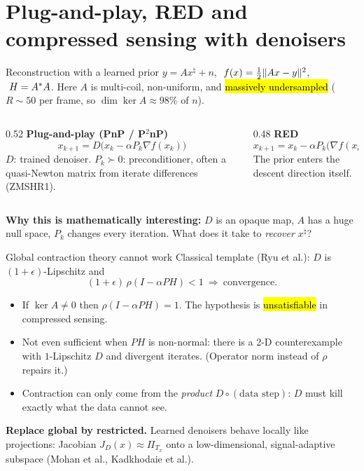 \section{Plug-and-play, RED and compressed sensing with denoisers}

\begin{frame}{Reconstruction with a learned prior}
$y=Ax^\natural+n$, $\ f(x)=\tfrac12\lVert Ax-y\rVert^2$, $\ H=A^{*} A$. Here $A$ is multi-coil, non-uniform, and \hl{massively undersampled} ($R\sim50$ per frame, so $\dim\ker A\approx 98\%$ of $n$).
\pause
\medskip
\begin{columns}[T]
\begin{column}{0.52\textwidth}
\textbf{Plug-and-play (PnP / P$^2$nP)}
\[ x_{k+1}=D\big(x_k-\alpha P_k\nabla f(x_k)\big) \]
$D$: trained denoiser. $P_k\succ0$: preconditioner, often a quasi-Newton matrix from iterate differences (ZMSHR1).
\end{column}
\begin{column}{0.48\textwidth}
\textbf{RED}
\[ x_{k+1}=x_k-\alpha P_k\big(\nabla f(x_k)+\lambda(x_k-D(x_k))\big) \]
The prior enters the descent direction itself.
\end{column}
\end{columns}
\pause
\medskip
\textbf{Why this is mathematically interesting:} $D$ is an opaque map, $A$ has a huge null space, $P_k$ changes every iteration. What does it take to \emph{recover $x^\natural$}?
\end{frame}

\begin{frame}{Global contraction theory cannot work}
Classical template (Ryu et al.): $D$ is $(1+\epsilon)$-Lipschitz and
\[ (1+\epsilon)\,\rho(I-\alpha PH)<1\ \Rightarrow\ \text{convergence}. \]
\pause
\begin{itemize}
\item If $\ker A\neq0$ then $\rho(I-\alpha PH)=1$. The hypothesis is \hl{unsatisfiable} in compressed sensing.
\item Not even sufficient when $PH$ is non-normal: there is a 2-D counterexample with $1$-Lipschitz $D$ and divergent iterates. (Operator norm instead of $\rho$ repairs it.)
\item Contraction can only come from the \emph{product} $D\circ(\text{data step})$: $D$ must kill exactly what the data cannot see.
\end{itemize}
\pause
\textbf{Replace global by restricted.} Learned denoisers behave locally like projections: Jacobian $J_D(x)\approx\Pi_{T_x}$ onto a low-dimensional, signal-adaptive subspace (Mohan et al., Kadkhodaie et al.).
\end{frame}

